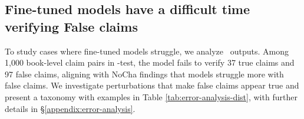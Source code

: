 \subsection{Fine-tuned models have a difficult time verifying False claims} \label{sec:error-analysis}
To study cases where fine-tuned models struggle, we analyze \qwenftbalanced\ outputs. Among 1,000 book-level claim pairs in \pipeline-test, the model fails to verify 37 true claims and 97 false claims, aligning with NoCha findings \cite{karpinska_one_2024} that models struggle more with false claims. We investigate perturbations that make false claims appear true and present a taxonomy with examples in Table \ref{tab:error-analysis-dist}, with further details in \S\ref{appendix:error-analysis}.

